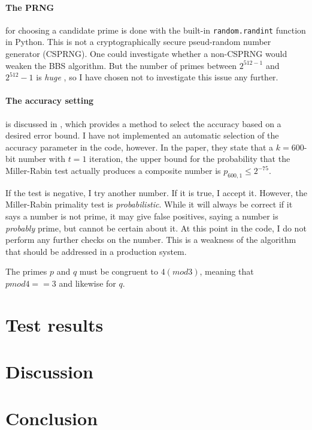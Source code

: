 \documentclass[a4paper,english,12pt]{article}
\begin{document}
\paragraph{The PRNG} for choosing a candidate prime is done with the built-in
\texttt{random.randint} function in Python. This is not a cryptographically
secure pseud-random number generator (CSPRNG). One could investigate whether a
non-CSPRNG would weaken the BBS algorithm. But the number of primes between
$2^{512-1}$ and $2^{512}-1$ is \textit{huge} \cite{wiki:prime.counting}, so I
have chosen not to investigate this issue any further.

\paragraph{The accuracy setting} is discussed in \cite{damgaard1993average}, which
provides a method to select the accuracy based on a desired error bound. I have
not implemented an automatic selection of the accuracy parameter in the code,
however. In the paper, they state that a $k=600$-bit number with $t=1$
iteration, the upper bound for the probability that the Miller-Rabin test
actually produces a composite number is $p_{600, 1} \leqslant 2^{-75}$.

If the test is negative, I try another number. If it is true, I accept
it. However, the Miller-Rabin primality test is \textit{probabilistic}. While
it will always be correct if it says a number is not prime, it may give false
positives, saying a number is \textit{probably} prime, but cannot be certain
about it. At this point in the code, I do not perform any further checks on the
number. This is a weakness of the algorithm that should be addressed in a
production system.

The primes $p$ and $q$ must be congruent to $4 (mod 3)$, meaning that $p mod 4
== 3$ and likewise for $q$.

\section{Test results}

\section{Discussion}

\section{Conclusion}



\end{document}

